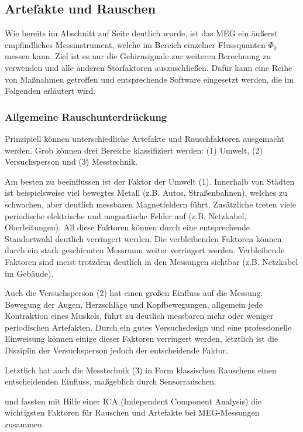 \documentclass[doc,a4paper,12pt]{apa6}
\makeatletter
\DeclareRobustCommand*{\nameref}[1]{%
      \glqq{\myorg@nameref{#1}}\grqq%
    }%
\makeatother
\begin{document}
\subsection{Artefakte und Rauschen}

Wie bereits im Abschnitt \nameref{sec:squids} auf Seite \pageref{sec:squids} deutlich wurde, ist das MEG ein äußerst empfindliches Messinstrument, welche im Bereich einzelner Flussquanten $\Phi_0$ messen kann. Ziel ist es nur die Gehirnsignale zur weiteren Berechnung zu verwenden und alle anderen Störfaktoren auszuschließen. Dafür kann eine Reihe von Maßnahmen getroffen und entsprechende Software eingesetzt werden, die im Folgenden erläutert wird.

\subsubsection{Allgemeine Rauschunterdrückung}

Prinzipiell können unterschiedliche Artefakte und Rauschfaktoren ausgemacht werden. Grob können drei Bereiche klassifiziert werden: (1) Umwelt, (2) Versuchsperson und (3) Messtechnik.

Am besten zu beeinflussen ist der Faktor der Umwelt (1). Innerhalb von Städten ist beispielsweise viel bewegtes Metall (z.B. Autos, Straßenbahnen), welches zu schwachen, aber deutlich messbaren Magnetfeldern führt. Zusätzliche treten viele periodische elektrische und magnetische Felder auf (z.B. Netzkabel, Oberleitungen). All diese Faktoren können durch eine entsprechende Standortwahl deutlich verringert werden. Die verbleibenden Faktoren können durch ein stark geschirmten Messraum weiter verringert werden. Verbleibende Faktoren sind meist trotzdem deutlich in den Messungen sichtbar (z.B. Netzkabel im Gebäude).

Auch die Versuchsperson (2) hat einen großen Einfluss auf die Messung. Bewegung der Augen, Herzschläge und Kopfbewegungen, allgemein jede Kontraktion eines Muskels, führt zu deutlich messbaren mehr oder weniger periodischen Artefakten. Durch ein gutes Versuchsdesign und eine professionelle Einweisung können einige dieser Faktoren verringert werden, letztlich ist die Disziplin der Versuchsperson jedoch der entscheidende Faktor.

Letztlich hat auch die Messtechnik (3) in Form klassischen Rauschens einen entscheidenden Einfluss, maßgeblich durch Sensorrauschen.

\textcite{vigario1998independent} und \textcite{vigario2000independent} fassten mit Hilfe einer ICA (Independent Component Analysis) die wichtigsten Faktoren für Rauschen und Artefakte bei MEG-Messungen zusammen.
\end{document}
